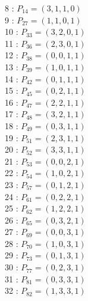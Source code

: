 \documentclass{article}
\begin{document}
{\begin{multicols}{3}
8 : $P_{14}=( 3, 1, 1, 0 )$\\
9 : $P_{27}=( 1, 1, 0, 1 )$\\
10 : $P_{33}=( 3, 2, 0, 1 )$\\
11 : $P_{36}=( 2, 3, 0, 1 )$\\
12 : $P_{38}=( 0, 0, 1, 1 )$\\
13 : $P_{39}=( 1, 0, 1, 1 )$\\
14 : $P_{42}=( 0, 1, 1, 1 )$\\
15 : $P_{45}=( 0, 2, 1, 1 )$\\
16 : $P_{47}=( 2, 2, 1, 1 )$\\
17 : $P_{48}=( 3, 2, 1, 1 )$\\
18 : $P_{49}=( 0, 3, 1, 1 )$\\
19 : $P_{51}=( 2, 3, 1, 1 )$\\
20 : $P_{52}=( 3, 3, 1, 1 )$\\
21 : $P_{53}=( 0, 0, 2, 1 )$\\
22 : $P_{54}=( 1, 0, 2, 1 )$\\
23 : $P_{57}=( 0, 1, 2, 1 )$\\
24 : $P_{61}=( 0, 2, 2, 1 )$\\
25 : $P_{62}=( 1, 2, 2, 1 )$\\
26 : $P_{65}=( 0, 3, 2, 1 )$\\
27 : $P_{69}=( 0, 0, 3, 1 )$\\
28 : $P_{70}=( 1, 0, 3, 1 )$\\
29 : $P_{73}=( 0, 1, 3, 1 )$\\
30 : $P_{77}=( 0, 2, 3, 1 )$\\
31 : $P_{81}=( 0, 3, 3, 1 )$\\
32 : $P_{82}=( 1, 3, 3, 1 )$\\
\end{multicols}


%


%


}%
\end{document}
